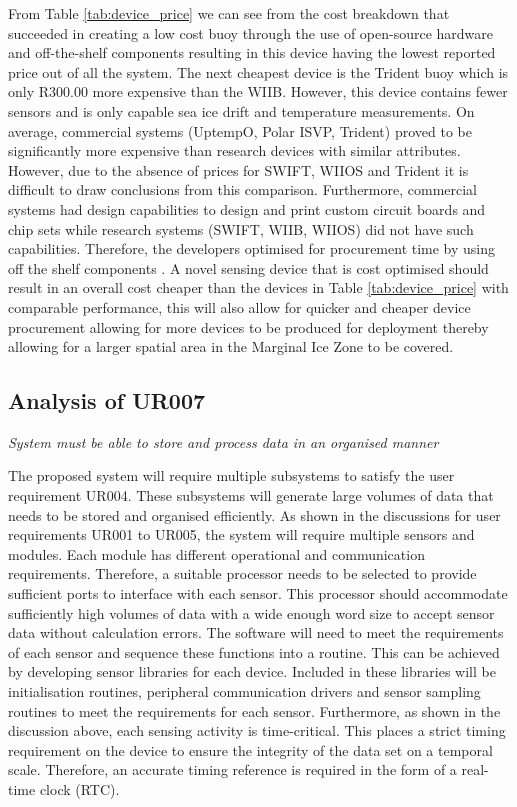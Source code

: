 From Table \ref{tab:device_price} we can see from the cost breakdown that \textcite{rabault2019open} succeeded in creating a low cost buoy through the use of open-source hardware and off-the-shelf components resulting in this device having the lowest reported price out of all the system. The next cheapest device is the Trident buoy which is only R300.00 more expensive than the WIIB. However, this device contains fewer sensors and is only capable sea ice drift and temperature measurements. On average, commercial systems (UptempO, Polar ISVP, Trident) proved to be significantly more expensive than research devices with similar attributes. However, due to the absence of prices for SWIFT, WIIOS and Trident it is difficult to draw conclusions from this comparison. Furthermore, commercial systems had design capabilities to design and print custom circuit boards and chip sets while research systems (SWIFT, WIIB, WIIOS) did not have such capabilities. Therefore, the developers optimised for procurement time by using off the shelf components \cite{kohout2015device,rabault2019open}. A novel sensing device that is cost optimised should result in an overall cost cheaper than the devices in Table \ref{tab:device_price} with comparable performance, this will also allow for quicker and cheaper device procurement allowing for more devices to be produced for deployment thereby allowing for a larger spatial area in the Marginal Ice Zone to be covered.

\subsection{Analysis of UR007}

\textit{System must be able to store and process data in an organised manner}

The proposed system will require multiple subsystems to satisfy the user requirement UR004. These subsystems will generate large volumes of data that needs to be stored and organised efficiently. As shown in the discussions for user requirements UR001 to UR005, the system will require multiple sensors and modules. Each module has different operational and communication requirements. Therefore, a suitable processor needs to be selected to provide sufficient ports to interface with each sensor. This processor should accommodate sufficiently high volumes of data with a wide enough word size to accept sensor data without calculation errors. The software will need to meet the requirements of each sensor and sequence these functions into a routine. This can be achieved by developing sensor libraries for each device. Included in these libraries will be initialisation routines, peripheral communication drivers and sensor sampling routines to meet the requirements for each sensor. Furthermore, as shown in the discussion above, each sensing activity is time-critical. This places a strict timing requirement on the device to ensure the integrity of the data set on a temporal scale. Therefore, an accurate timing reference is required in the form of a real-time clock (RTC). \par 

